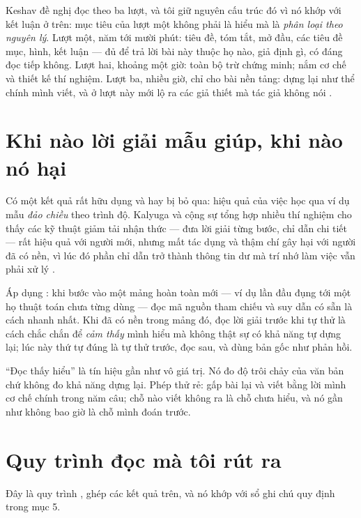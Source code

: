 \documentclass[../hieu-suat.tex]{subfiles}
\begin{document}
Keshav \cite{keshav2007} đề nghị đọc theo ba lượt, và tôi giữ nguyên cấu trúc đó vì nó khớp với kết luận ở trên: mục tiêu của lượt một không phải là hiểu mà là \emph{phân loại theo nguyên lý}. Lượt một, năm tới mười phút: tiêu đề, tóm tắt, mở đầu, các tiêu đề mục, hình, kết luận --- đủ để trả lời bài này thuộc họ nào, giả định gì, có đáng đọc tiếp không. Lượt hai, khoảng một giờ: toàn bộ trừ chứng minh; nắm cơ chế và thiết kế thí nghiệm. Lượt ba, nhiều giờ, chỉ cho bài nền tảng: dựng lại như thể chính mình viết, và ở lượt này mới lộ ra các giả thiết mà tác giả không nói \nT{}.

\section{Khi nào lời giải mẫu giúp, khi nào nó hại}

Có một kết quả rất hữu dụng và hay bị bỏ qua: hiệu quả của việc học qua ví dụ mẫu \emph{đảo chiều} theo trình độ. Kalyuga và cộng sự \cite{kalyuga2003} tổng hợp nhiều thí nghiệm cho thấy các kỹ thuật giảm tải nhận thức --- đưa lời giải từng bước, chỉ dẫn chi tiết --- rất hiệu quả với người mới, nhưng mất tác dụng và thậm chí gây hại với người đã có nền, vì lúc đó phần chỉ dẫn trở thành thông tin dư mà trí nhớ làm việc vẫn phải xử lý \nD{}.

Áp dụng \nM{}: khi bước vào một mảng hoàn toàn mới --- ví dụ lần đầu đụng tới một họ thuật toán chưa từng dùng --- đọc mã nguồn tham chiếu và suy dẫn có sẵn là cách nhanh nhất. Khi đã có nền trong mảng đó, đọc lời giải trước khi tự thử là cách chắc chắn để \emph{cảm thấy} mình hiểu mà không thật sự có khả năng tự dựng lại; lúc này thứ tự đúng là tự thử trước, đọc sau, và dùng bản gốc như phản hồi.

\begin{cambay}
``Đọc thấy hiểu'' là tín hiệu gần như vô giá trị. Nó đo độ trôi chảy của văn bản chứ không đo khả năng dựng lại. Phép thử rẻ: gấp bài lại và viết bằng lời mình cơ chế chính trong năm câu; chỗ nào viết không ra là chỗ chưa hiểu, và nó gần như không bao giờ là chỗ mình đoán trước.
\end{cambay}

\section{Quy trình đọc mà tôi rút ra}

Đây là quy trình \nM{}, ghép các kết quả trên, và nó khớp với sổ ghi chú quy định trong  mục 5.
\end{document}
